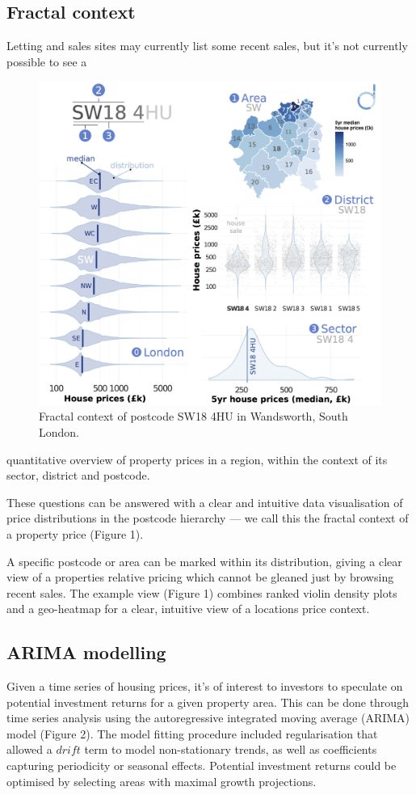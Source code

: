 \documentclass[
10pt, %
a4paper, %
oneside, %
headinclude,footinclude, %
BCOR5mm, %
]{scrartcl}
\begin{document}
\subsection*{Fractal context}

Letting and sales sites may currently list some recent sales, but it's
not currently possible to see a

\begin{figure}
\vspace{.5em}
\centering
\includegraphics[width=.43\textwidth]{Figures/fractal.png}
\caption{ Fractal context of postcode SW18 4HU in Wandsworth, South London.}
\end{figure}

\noindent quantitative overview of property
prices in a region, within the context of its sector, district and
postcode.

These questions can be answered with a clear and intuitive data
visualisation of price distributions in the postcode hierarchy --- we
call this the fractal context of a property price (Figure 1).

A specific postcode or area can be marked within its distribution,
giving a clear view of a properties relative pricing which cannot be
gleaned just by browsing recent sales. The example view (Figure 1)
combines ranked violin density plots and a geo-heatmap for a clear,
intuitive view of a locations price context.

\subsection*{ARIMA modelling}

Given a time series of housing prices, it's of interest to investors
to speculate on potential investment returns for a given property
area. This can be done through time series analysis using the
autoregressive integrated moving average (ARIMA) model (Figure 2). The
model fitting procedure included regularisation that allowed a $drift$
term to model non-stationary trends, as well as coefficients capturing
periodicity or seasonal effects. Potential investment returns could be
optimised by selecting areas with
maximal growth projections. \\
\end{document}

